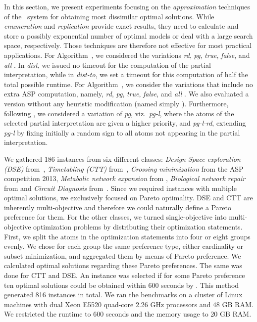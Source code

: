 %
In this section, we present experiments focusing on the \emph{approximation} techniques of the \asprin\ system for obtaining most dissimilar optimal
solutions. 
%
While \emph{enumeration} and \emph{replication} provide exact results, they need to calculate and store a possibly exponential number of optimal
models or deal with a large search space, respectively.
%
Those techniques are therefore not effective for most practical applications.
%
For Algorithm~, we considered the variations \textit{rd}, \textit{pg}, \textit{true}, \textit{false}, and \textit{all} .
%
In \textit{dist}, we issued no timeout for the computation of the partial interpretation, 
while in \textit{dist-to}, we set a timeout for this computation of half the total possible runtime.
%
For Algorithm~, we consider the variations that include no extra ASP computation, namely, 
\textit{rd}, \textit{pg}, \textit{true}, \textit{false}, and \textit{all} .
%
We also evaluated a version without any heuristic modification (named simply ).
%
Furthermore, following \cite{nadel11a}, 
we considered a variation of \textit{pg}, viz.~\textit{pg-l}, 
where the atoms of the selected partial interpretation are given a higher priority, 
and \textit{pg-l-rd}, extending \textit{pg-l} by fixing initially a random sign to all atoms not appearing in the partial interpretation.

We gathered 186 instances from six different classes: \emph{Design Space exploration (DSE)} from~\cite{angeglharesc13a}, \emph{Timetabling (CTT)}
from~\cite{basotainsc13a}, \emph{Crossing minimization} from the ASP competition 2013, \emph{Metabolic network expansion} from \cite{schthi09a},
\emph{Biological network repair} from \cite{geguivscsithve10a} and \emph{Circuit Diagnosis} from~\cite{sidiqqi11a}.
Since we required instances with multiple optimal solutions, we exclusively focused on Pareto optimality. 
DSE and CTT are inherently multi-objective and therefore we could naturally define a Pareto preference for them. 
For the other classes, we turned single-objective into multi-objective optimization problems by distributing their optimization statements.
First, we split the atoms in the optimization statements into four or eight groups evenly. 
We chose for each group the same preference type, either cardinality or subset minimization, and aggregated them by means of Pareto preference.
We calculated optimal solutions regarding these Pareto preferences.
The same was done for CTT and DSE.
An instance was selected if for some Pareto preference ten optimal solutions could be obtained within 600 seconds by \asprin. 
This method generated 816 instances in total. 
We ran the benchmarks on a cluster of Linux machines with dual Xeon E5520 quad-core 2.26 GHz processors and 48 GB RAM. 
We restricted the runtime to 600 seconds and the memory usage to 20 GB RAM.

